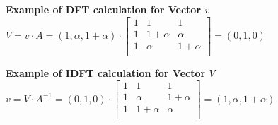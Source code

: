 \begin{minipage}{9cm}
	\textbf{Example of DFT calculation for Vector $v$}\\
	$V = v \cdot A = (1,\alpha,1+\alpha) \cdot \begin{bmatrix}
			1	&	1			&	1 \\
			1	&	1+\alpha	&	\alpha	\\
			1	&	\alpha		& 	1+\alpha \\
			\end{bmatrix}=(0,1,0)$
\end{minipage}
\begin{minipage}{9cm}		
	\textbf{Example of IDFT calculation for Vector $V$}\\
	$v = V \cdot A^{-1} = (0,1,0) \cdot \begin{bmatrix}
			1	&	1			&	1 \\
			1	&	\alpha		&	1+\alpha	\\
			1	&	1+\alpha	&	\alpha \\
			\end{bmatrix}=(1,\alpha,1+\alpha)$
\end{minipage}